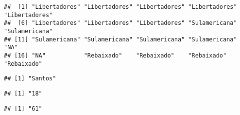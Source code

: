\documentclass[
]{book}
\newenvironment{Shaded}{\begin{snugshade}}{\end{snugshade}}
\newcommand{\CommentTok}[1]{\textcolor[rgb]{0.56,0.35,0.01}{\textit{#1}}}
\newcommand{\DecValTok}[1]{\textcolor[rgb]{0.00,0.00,0.81}{#1}}
\newcommand{\FloatTok}[1]{\textcolor[rgb]{0.00,0.00,0.81}{#1}}
\newcommand{\NormalTok}[1]{#1}
\newcommand{\SpecialCharTok}[1]{\textcolor[rgb]{0.00,0.00,0.00}{#1}}
\begin{document}
\begin{Shaded}
\end{Shaded}

\begin{verbatim}
##  [1] "Libertadores" "Libertadores" "Libertadores" "Libertadores" "Libertadores"
##  [6] "Libertadores" "Libertadores" "Libertadores" "Sulamericana" "Sulamericana"
## [11] "Sulamericana" "Sulamericana" "Sulamericana" "Sulamericana" "NA"          
## [16] "NA"           "Rebaixado"    "Rebaixado"    "Rebaixado"    "Rebaixado"
\end{verbatim}

\begin{Shaded}
\end{Shaded}

\begin{verbatim}
## [1] "Santos"
\end{verbatim}

\begin{Shaded}
\end{Shaded}

\begin{verbatim}
## [1] "18"
\end{verbatim}

\begin{Shaded}
\end{Shaded}

\begin{verbatim}
## [1] "61"
\end{verbatim}
\end{document}
